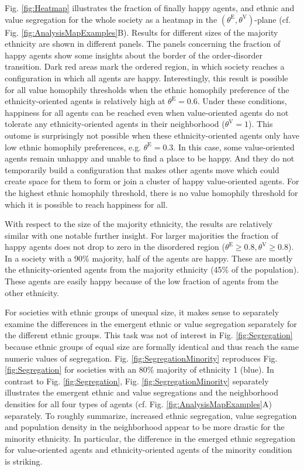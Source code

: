 \documentclass{ws-acs}
\begin{document}
{Fig. \ref{fig:Heatmap} illustrates the fraction of finally happy agents, and ethnic and value segregation for the whole society as a heatmap in the $(\theta^\text{E},\theta^\text{V})$-plane (cf. Fig. \ref{fig:AnalysisMapExamples}B). Results for different sizes of the majority ethnicity are shown in different panels. The panels concerning the fraction of happy agents show some insights about the border of the order-disorder transition. Dark red areas mark the ordered region, in which society reaches a configuration in which all agents are happy. Interestingly, this result is possible for all value homophily thresholds when the ethnic homophily preference of the ethnicity-oriented agents is relatively high at $\theta^\text{E}=0.6$. Under these conditions, happiness for all agents can be reached even when value-oriented agents do not tolerate any ethnicity-oriented agents in their neighborhood ($\theta^\text{V}=1$). This outome is surprisingly not possible when these ethnicity-oriented agents only have low ethnic homophily preferences, e.g. $\theta^\text{E}=0.3$. In this case, some value-oriented agents remain unhappy and unable to find a place to be happy. And they do not temporarily build a configuration that makes other agents move which could create space for them to form or join a cluster of happy value-oriented agents. For the highest ethnic homophily threshold, there is no value homophily threshold for which it is possible to  reach happiness for all.

With respect to the size of the majority ethnicity, the results are relatively similar with one notable further insight. For larger majorities the fraction of happy agents does not drop to zero in the disordered region ($\theta^\text{E}\geq 0.8, \theta^\text{V}\geq 0.8$). In a society with a 90\% majority, half of the agents are happy. These are mostly the ethnicity-oriented agents from the majority ethnicity (45\% of the population). These agents are easily happy because of the low fraction of agents from the other ethnicity. 

For societies with ethnic groups of unequal size, it makes sense to separately examine the differences in the emergent ethnic or value segregation separately for the different ethnic groups. This task was not of interest in Fig. \ref{fig:Segregation} because  ethnic groups of equal size are formally identical and thus reach the same numeric values of segregation. Fig. \ref{fig:SegregationMinority} reproduces Fig. \ref{fig:Segregation} for societies with an 80\% majority of ethnicity 1 (blue). In contrast to Fig. \ref{fig:Segregation}, Fig. \ref{fig:SegregationMinority} separately illustrates the emergent ethnic and value segregations and the neighborhood densities for all four types of agents (cf. Fig. \ref{fig:AnalysisMapExamples}A) separately. To roughly summarize, increased ethnic segregation, value segregation and population density in the neighborhood appear to be more drastic for the minority ethnicity. In particular, the difference in the emerged ethnic segregation for value-oriented agents and ethnicity-oriented agents of the minority condition is striking.

}
\end{document}
